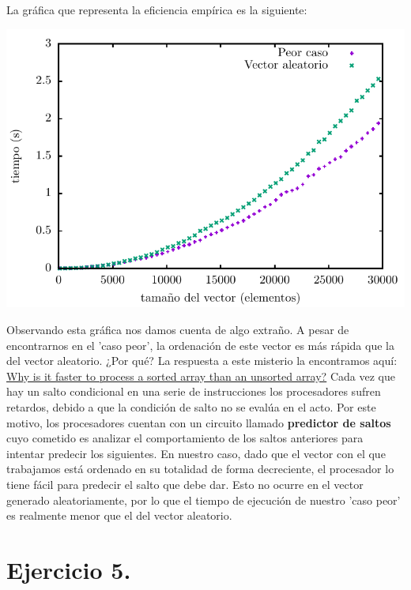 \documentclass[11pt,a4paper]{article}
\begin{document}
La gráfica que representa la eficiencia empírica es la siguiente:

\begin{center}
	\includegraphics{img/tiempos_burbuja_peor_caso.pdf}
\end{center}

\hypersetup{linkcolor=green}

Observando esta gráfica nos damos cuenta de algo extraño. A pesar de encontrarnos en el 'caso peor', la ordenación de este vector es más rápida que la del vector aleatorio. ¿Por qué? La respuesta a este misterio la encontramos aquí: \href{http://stackoverflow.com/questions/11227809/why-is-it-faster-to-process-a-sorted-array-than-an-unsorted-array}{Why is it faster to process a sorted array than an unsorted array?} Cada vez que hay un salto condicional en una serie de instrucciones los procesadores sufren retardos, debido a que la condición de salto no se evalúa en el acto. Por este motivo, los procesadores cuentan con un circuito llamado \textbf{predictor de saltos} cuyo cometido es analizar el comportamiento de los saltos anteriores para intentar predecir los siguientes. En nuestro caso, dado que el vector con el que trabajamos está ordenado en su totalidad de forma decreciente, el procesador lo tiene fácil para predecir el salto que debe dar. Esto no ocurre en el vector generado aleatoriamente, por lo que el tiempo de ejecución de nuestro 'caso peor' es realmente menor que el del vector aleatorio.

\section*{Ejercicio 5.}
\end{document}
